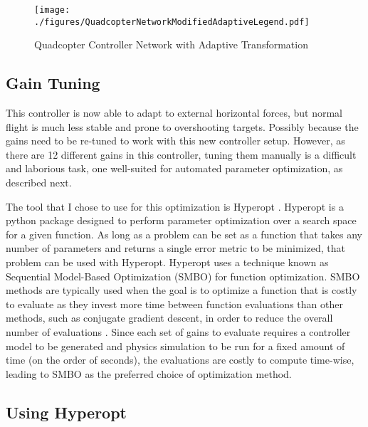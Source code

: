 \documentclass[letterpaper,12pt,titlepage,oneside,final]{book}
\begin{document}
\begin{figure}
\centering
\texttt{[image: ./figures/QuadcopterNetworkModifiedAdaptiveLegend.pdf]} %
\caption{Quadcopter Controller Network with Adaptive Transformation}
\label{fig:NetAdaptiveTransform}
\end{figure}


\subsection{Gain Tuning}

This controller is now able to adapt to external horizontal forces, but normal flight is much less stable and prone to overshooting targets. 
Possibly because the gains need to be re-tuned to work with this new controller setup. 
However, as there are 12 different gains in this controller, tuning them manually is a difficult and laborious task, one well-suited for automated parameter optimization, as described next.

The tool that I chose to use for this optimization is Hyperopt \cite{bergstra2013hyperopt}. 
Hyperopt is a python package designed to perform parameter optimization over a search space for a given function. 
As long as a problem can be set as a function that takes any number of parameters and returns a single error metric to be minimized, that problem can be used with Hyperopt. 
Hyperopt uses a technique known as Sequential Model-Based Optimization (SMBO) for function optimization.
SMBO methods are typically used when the goal is to optimize a function that is costly to evaluate as they invest more time between function evaluations than other methods, such as conjugate gradient descent, in order to reduce the overall number of evaluations \cite{mockus1978application, bergstra2013hyperopt}.
Since each set of gains to evaluate requires a controller model to be generated and physics simulation to be run for a fixed amount of time (on the order of seconds), the evaluations are costly to compute time-wise, leading to SMBO as the preferred choice of optimization method.

\subsection{Using Hyperopt}
\end{document}
